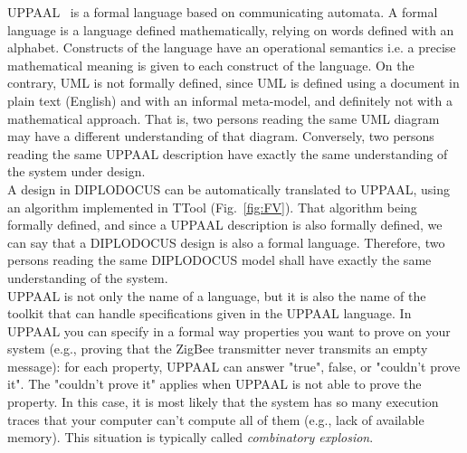 \documentclass{llncs}
\begin{document}
UPPAAL~\cite{UPPAAL} is a formal language based on communicating automata. A
formal language is a language defined mathematically, relying on words defined
with an alphabet. Constructs of the language have an operational semantics i.e.
a precise mathematical meaning is given to each construct of the language. On
the contrary, UML is not formally defined, since UML is defined using a document
in plain text (English) and with an informal meta-model, and definitely not with
a mathematical approach.
That is, two persons reading the same UML diagram may have a different
understanding of that diagram. Conversely, two persons reading the same UPPAAL
description have exactly the same understanding of the system under design.\\
A design in DIPLODOCUS can be automatically translated to UPPAAL, using an
algorithm implemented in TTool (Fig.~\ref{fig:FV}). That algorithm being
formally defined, and since a UPPAAL description is also formally defined, we
can say that a DIPLODOCUS design is also a formal language. Therefore, two
persons reading the same DIPLODOCUS model shall have exactly the same
understanding of the system.\\
UPPAAL is not only the name of a language, but it is also the name of the
toolkit that can handle specifications given in the UPPAAL language. In UPPAAL
you can specify in a formal way properties you want to prove on your system
(e.g., proving that the ZigBee transmitter never transmits an empty message):
for each property, UPPAAL can answer "true", false, or "couldn’t prove it". The
"couldn’t prove it" applies when UPPAAL is not able to prove the property. In
this case, it is most likely that the system has so many execution traces that
your computer can't compute all of them (e.g., lack of available memory). This
situation is typically called \textit{combinatory explosion}.
\end{document}
